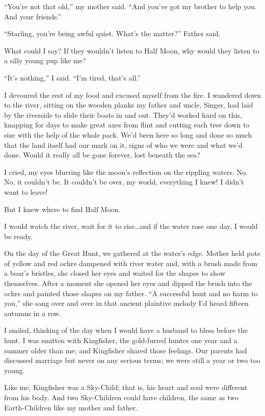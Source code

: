 ``You're not that old,'' my mother said. ``And you've got my brother to help you. And your friends.''

``Starling, you're being awful quiet. What's the matter?'' Father said.

What could I say? If they wouldn't listen to Half Moon, why would they listen to a silly young pup like me?

``It's nothing,'' I said. ``I'm tired, that's all.''

I devoured the rest of my food and excused myself from the fire. I wandered down to the river, sitting on the wooden planks my father and uncle, Singer, had laid by the riverside to slide their boats in and out. They'd worked hard on this, knapping for days to make great axes from flint and cutting each tree down to size with the help of the whole pack. We'd been here so long and done so much that the land itself had our mark on it, signs of who we were and what we'd done. Would it really all be gone forever, lost beneath the sea?

I cried, my eyes blurring like the moon's reflection on the rippling waters. No. No, it couldn't be. It couldn't be over, my world, everything I knew! I didn't want to leave!

But I knew where to find Half Moon.

I would watch the river, wait for it to rise\ldots{}and if the water rose one day, I would be ready.

\secdiv

\noindent On the day of the Great Hunt, we gathered at the water's edge. Mother held pots of yellow and red ochre dampened with river water and, with a brush made from a boar's bristles, she closed her eyes and waited for the shapes to show themselves. After a moment she opened her eyes and dipped the brush into the ochre and painted those shapes on my father. ``A successful hunt and no harm to you,'' she sang over and over in that ancient plaintive melody I'd heard fifteen autumns in a row.

I smiled, thinking of the day when I would have a husband to bless before the hunt. I was smitten with Kingfisher, the gold-furred hunter one year and a summer older than me; and Kingfisher shared those feelings. Our parents had discussed marriage but never on any serious terms; we were still a year or two too young.

Like me, Kingfisher was a Sky-Child; that is, his heart and soul were different from his body. And two Sky-Children could have children, the same as two Earth-Children like my mother and father.

